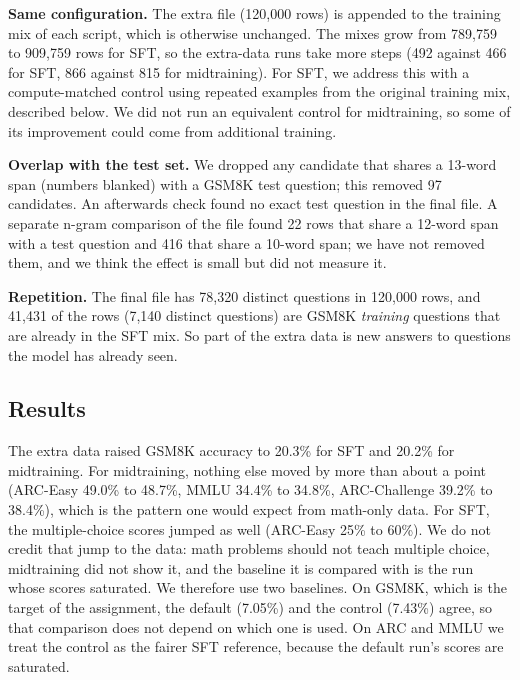 \documentclass[10pt]{article}
\begin{document}
\textbf{Same configuration.} The extra file (120{,}000 rows) is appended to the training mix of each script, which is otherwise unchanged. The mixes grow from 789{,}759 to 909{,}759 rows for SFT, so the extra-data runs take more steps (492 against 466 for SFT, 866 against 815 for midtraining). For SFT, we address this with a compute-matched control using repeated examples from the original training mix, described below. We did not run an equivalent control for midtraining, so some of its improvement could come from additional training.

\textbf{Overlap with the test set.} We dropped any candidate that shares a 13-word span (numbers blanked) with a GSM8K test question; this removed 97 candidates. An afterwards check found no exact test question in the final file. A separate n-gram comparison of the file found 22 rows that share a 12-word span with a test question and 416 that share a 10-word span; we have not removed them, and we think the effect is small but did not measure it.

\textbf{Repetition.} The final file has 78{,}320 distinct questions in 120{,}000 rows, and 41{,}431 of the rows (7{,}140 distinct questions) are GSM8K \emph{training} questions that are already in the SFT mix. So part of the extra data is new answers to questions the model has already seen.

\subsection*{Results}
The extra data raised GSM8K accuracy to 20.3\% for SFT and 20.2\% for midtraining. For midtraining, nothing else moved by more than about a point (ARC-Easy 49.0\% to 48.7\%, MMLU 34.4\% to 34.8\%, ARC-Challenge 39.2\% to 38.4\%), which is the pattern one would expect from math-only data. For SFT, the multiple-choice scores jumped as well (ARC-Easy 25\% to 60\%). We do not credit that jump to the data: math problems should not teach multiple choice, midtraining did not show it, and the baseline it is compared with is the run whose scores saturated. We therefore use two baselines. On GSM8K, which is the target of the assignment, the default (7.05\%) and the control (7.43\%) agree, so that comparison does not depend on which one is used. On ARC and MMLU we treat the control as the fairer SFT reference, because the default run's scores are saturated.
\end{document}
